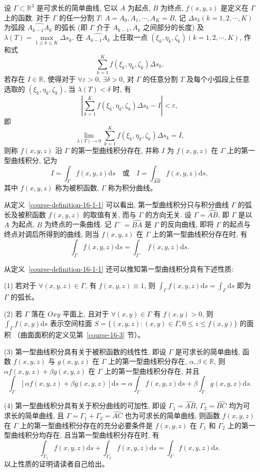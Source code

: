 \documentclass[12pt,fontset=fandol]{ctexart}
\begin{document}
\begin{definition}\label{course-definition-16-1-1}\quad 设 $\Gamma\subset\mathbb R^3$ 是可求长的简单曲线, 它以 $A$ 为起点, $B$ 为终点, $f(x,y,z)$ 是定义在 $\Gamma$ 上的函数. 对于 $\Gamma$ 的任一分割 $T$: $A=A_0,A_1,\cdots,A_K=B$, 记 $\Delta s_k(k=1,2,\cdots,K)$ 为弧段 $\widehat{A_{k-1}A_k}$ 的弧长 (即 $\Gamma$ 介于 $A_{k-1},A_k$ 之间部分的长度) 及 $\lambda(T)=\max\limits_{1\leqslant k\leqslant K}\Delta s_k$. 在 $\widehat{A_{k-1}A_k}$ 上任取一点 $(\xi_k,\eta_k,\zeta_k)(k=1,2,\cdots,K)$, 作和式
\[
  \sum_{k=1}^K f(\xi_k,\eta_k,\zeta_k)\Delta s_k.
\]
若存在 $I\in\mathbb R$, 使得对于 $\forall\varepsilon>0$, $\exists\delta>0$, 对 $\Gamma$ 的任意分割 $T$ 及每个小弧段上任意选取的 $(\xi_k,\eta_k,\zeta_k)$, 当 $\lambda(T)<\delta$ 时, 有
\[
  \left|\sum_{k=1}^K f(\xi_k,\eta_k,\zeta_k)\Delta s_k-I\right|<\varepsilon,
\]
即
\[
  \lim_{\lambda(T)\to0}\sum_{k=1}^K f(\xi_k,\eta_k,\zeta_k)\Delta s_k=I,
\]
则称 $f(x,y,z)$ 沿 $\Gamma$ 的第一型曲线积分存在, 并称 $I$ 为 $f(x,y,z)$ 在 $\Gamma$ 上的第一型曲线积分, 记为
\[
  I=\int_\Gamma f(x,y,z)\mathrm ds
  \quad\text{或}\quad
  I=\int_{\widehat{AB}} f(x,y,z)\mathrm ds,
\]
其中 $f(x,y,z)$ 称为被积函数, $\Gamma$ 称为积分曲线。

从定义~\ref{course-definition-16-1-1}  可以看出, 第一型曲线积分只与积分曲线 $\Gamma$ 的弧长及被积函数 $f(x,y,z)$ 的取值有关, 而与 $\Gamma$ 的方向无关. 设 $\Gamma=\widehat{AB}$, 即 $\Gamma$ 是以 $A$ 为起点, $B$ 为终点的一条曲线. 记 $\Gamma^-=\widehat{BA}$ 是 $\Gamma$ 的反向曲线, 即将 $\Gamma$ 的起点与终点对调后所得到的曲线, 则当 $f(x,y,z)$ 在 $\Gamma$ 上的第一型曲线积分存在时, 有
\[
  \int_\Gamma f(x,y,z)\mathrm ds=\int_{\Gamma^-} f(x,y,z)\mathrm ds.
\]

从定义~\ref{course-definition-16-1-1}  还可以推知第一型曲线积分具有下述性质:

(1) 若对于 $\forall(x,y,z)\in\Gamma$, 有 $f(x,y,z)\equiv1$, 则 $\int_\Gamma f(x,y,z)\mathrm ds=\int_\Gamma \mathrm ds$ 即为 $\Gamma$ 的弧长。

(2) 若 $\Gamma$ 落在 $Oxy$ 平面上, 且对于 $\forall(x,y)\in\Gamma$ 有 $f(x,y)>0$, 则 $\int_\Gamma f(x,y)\mathrm ds$ 表示空间柱面 $S=\{(x,y,z):(x,y)\in\Gamma,0\leqslant z\leqslant f(x,y)\}$ 的面积 （曲面面积的定义见第~\ref{course-16-3} 节）。

(3) 第一型曲线积分具有关于被积函数的线性性, 即设 $\Gamma$ 是可求长的简单曲线, 函数 $f(x,y,z)$ 与 $g(x,y,z)$ 在 $\Gamma$ 上的第一型曲线积分存在, $\alpha,\beta\in\mathbb R$, 则 $\alpha f(x,y,z)+\beta g(x,y,z)$ 在 $\Gamma$ 上的第一型曲线积分存在, 并且
\[
  \int_\Gamma [\alpha f(x,y,z)+\beta g(x,y,z)]\mathrm ds
  =\alpha\int_\Gamma f(x,y,z)\mathrm ds
  +\beta\int_\Gamma g(x,y,z)\mathrm ds.
\]

(4) 第一型曲线积分具有关于积分曲线的可加性, 即设 $\Gamma_1=\widehat{AB}$, $\Gamma_2=\widehat{BC}$ 均为可求长的简单曲线, 且 $\Gamma=\Gamma_1+\Gamma_2=\widehat{AC}$ 也为可求长的简单曲线, 则函数 $f(x,y,z)$ 在 $\Gamma$ 上的第一型曲线积分存在的充分必要条件是 $f(x,y,z)$ 在 $\Gamma_1$ 和 $\Gamma_2$ 上的第一型曲线积分均存在, 且当第一型曲线积分存在时, 有
\[
  \int_{\Gamma_1} f(x,y,z)\mathrm ds+\int_{\Gamma_2} f(x,y,z)\mathrm ds
  =\int_\Gamma f(x,y,z)\mathrm ds.
\]
以上性质的证明请读者自己给出。

\end{definition}
\end{document}

